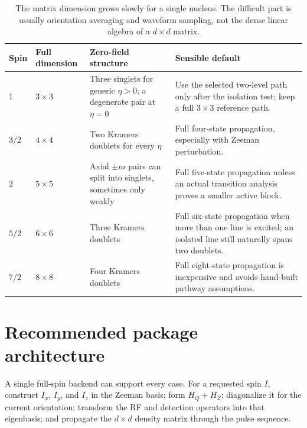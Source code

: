 \documentclass[11pt,letterpaper]{article}
\begin{document}
\begin{table}[H]
\centering
\small
\begin{tabularx}{\textwidth}{>{\RaggedRight\arraybackslash\bfseries}p{}>{\RaggedRight\arraybackslash}p{}>{\RaggedRight\arraybackslash}X>{\RaggedRight\arraybackslash}X}
\toprule
Spin & Full dimension & Zero-field structure & Sensible default \\
\midrule
$1$ & $3\times3$ & Three singlets for generic $\eta>0$; a degenerate pair at $\eta=0$ & Use the selected two-level path only after the isolation test; keep a full $3\times3$ reference path. \\
$3/2$ & $4\times4$ & Two Kramers doublets for every $\eta$ & Full four-state propagation, especially with Zeeman perturbation. \\
$2$ & $5\times5$ & Axial $\pm m$ pairs can split into singlets, sometimes only weakly & Full five-state propagation unless an actual transition analysis proves a smaller active block. \\
$5/2$ & $6\times6$ & Three Kramers doublets & Full six-state propagation when more than one line is excited; an isolated line still naturally spans two doublets. \\
$7/2$ & $8\times8$ & Four Kramers doublets & Full eight-state propagation is inexpensive and avoids hand-built pathway assumptions. \\
\bottomrule
\end{tabularx}
\caption{The matrix dimension grows slowly for a single nucleus. The difficult part is usually orientation averaging and waveform sampling, not the dense linear algebra of a $d\times d$ matrix.}
\end{table}

\section{Recommended package architecture}

A single full-spin backend can support every case. For a requested spin $I$, construct $I_x$, $I_y$, and $I_z$ in the Zeeman basis; form $H_Q+H_Z$; diagonalize it for the current orientation; transform the RF and detection operators into that eigenbasis; and propagate the $d\times d$ density matrix through the pulse sequence.
\end{document}
